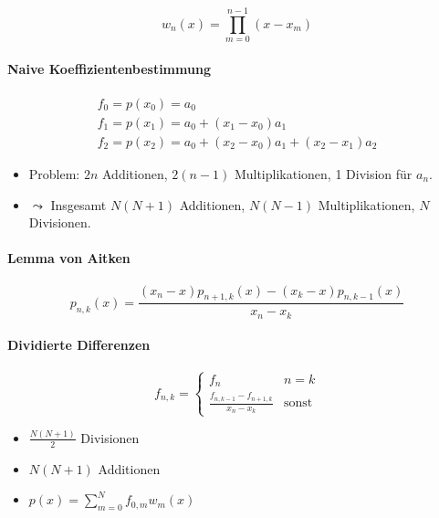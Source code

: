 \documentclass[a4paper, 14pt]{article}
\begin{document}
	\begin{equation}
		w_n(x) = \prod_{m = 0}^{n - 1}{(x - x_m)}
	\end{equation}

	\paragraph{Naive Koeffizientenbestimmung}
	
	\begin{eqnarray}
		f_0 = p(x_0) = a_0 \\
		f_1 = p(x_1) = a_0 + (x_1 - x_0) a_1 \\
		f_2 = p(x_2) = a_0 + (x_2 - x_0) a_1 + (x_2 - x_1) a_2
	\end{eqnarray}
	
	\begin{itemize}
		\item Problem: $2n$ Additionen, $2(n - 1)$ Multiplikationen, 1 Division für $a_n$.
		\item $\leadsto$ Insgesamt $N(N + 1)$ Additionen, $N(N - 1)$ Multiplikationen, $N$ Divisionen.
	\end{itemize}

	\paragraph{Lemma von Aitken}

	\begin{equation}
		p_{n, k}(x) = \frac{(x_n - x) p_{n + 1, k}(x) - (x_k - x) p_{n, k - 1}(x)}{x_n - x_k}
	\end{equation}

	\paragraph{Dividierte Differenzen}

	\begin{equation}
		f_{n, k} = \begin{cases}
			f_{n} & n = k \\
			\frac{f_{n, k - 1} - f_{n + 1, k}}{x_n - x_k} & \textrm{sonst}
		\end{cases}
	\end{equation}

	\begin{itemize}
		\item $\frac{N(N + 1)}{2}$ Divisionen
		\item $N(N + 1)$ Additionen
		\item $p(x) = \sum_{m = 0}^{N}{f_{0, m} w_m(x)}$
	\end{itemize}
\end{document}
